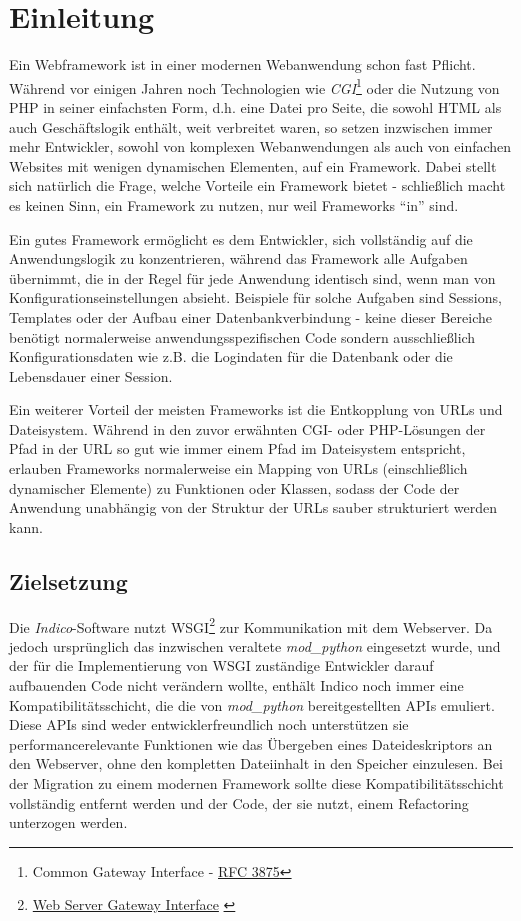 \chapter{Einleitung}

Ein Webframework ist in einer modernen Webanwendung schon fast Pflicht. Während vor einigen
Jahren noch Technologien wie \emph{CGI}\footnote{Common Gateway Interface -
\href{http://www.ietf.org/rfc/rfc3875}{RFC 3875}\citep{rfc3875}} oder die Nutzung von PHP in seiner
einfachsten Form, d.h. eine Datei pro Seite, die sowohl HTML als auch Geschäftslogik enthält, weit
verbreitet waren, so setzen inzwischen immer mehr Entwickler, sowohl von komplexen Webanwendungen als
auch von einfachen Websites mit wenigen dynamischen Elementen, auf ein Framework. Dabei stellt sich
natürlich die Frage, welche Vorteile ein Framework bietet - schließlich macht es keinen Sinn, ein
Framework zu nutzen, nur weil Frameworks \enquote{in} sind.

Ein gutes Framework ermöglicht es dem Entwickler, sich vollständig auf die Anwendungslogik zu
konzentrieren, während das Framework alle Aufgaben übernimmt, die in der Regel für jede Anwendung
identisch sind, wenn man von Konfigurationseinstellungen absieht. Beispiele für solche Aufgaben sind
Sessions, Templates oder der Aufbau einer Datenbankverbindung - keine dieser Bereiche benötigt
normalerweise anwendungsspezifischen Code sondern ausschließlich Konfigurationsdaten wie z.B. die
Logindaten für die Datenbank oder die Lebensdauer einer Session.

Ein weiterer Vorteil der meisten Frameworks ist die Entkopplung von URLs und Dateisystem.
Während in den zuvor erwähnten CGI- oder PHP-Lösungen der Pfad in der URL so gut wie immer einem
Pfad im Dateisystem entspricht, erlauben Frameworks normalerweise ein Mapping von URLs
(einschließlich dynamischer Elemente) zu Funktionen oder Klassen, sodass der Code der Anwendung
unabhängig von der Struktur der URLs sauber strukturiert werden kann.


\section{Zielsetzung}

Die \emph{Indico}-Software nutzt WSGI\footnote{\href{http://www.python.org/dev/peps/pep-0333/}{Web
Server Gateway Interface} \citep{wsgi}} zur Kommunikation mit dem Webserver. Da jedoch ursprünglich
das inzwischen veraltete \emph{mod\_python} eingesetzt wurde, und der für die Implementierung von
WSGI zuständige Entwickler darauf aufbauenden Code nicht verändern wollte, enthält Indico noch immer
eine Kompatibilitätsschicht, die die von \emph{mod\_python} bereitgestellten APIs emuliert. Diese
APIs sind weder entwicklerfreundlich noch unterstützen sie performancerelevante Funktionen wie das
Übergeben eines Dateideskriptors an den Webserver, ohne den kompletten
Dateiinhalt in den Speicher einzulesen. Bei der Migration zu einem modernen Framework sollte diese
Kompatibilitätsschicht vollständig entfernt werden und der Code, der sie nutzt, einem Refactoring
unterzogen werden.

